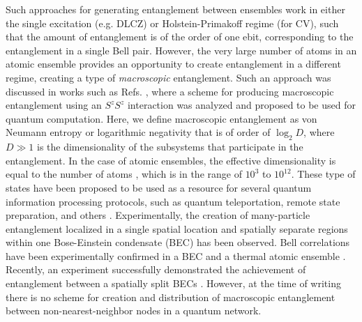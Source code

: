 \documentclass[%
  prx,%
  twocolumn,%
  preprintnumbers,%
  amsmath,%
  amssymb,%
  superscriptaddress%
]{revtex4}
\begin{document}
Such approaches for generating entanglement between ensembles work in either the single excitation  (e.g.  DLCZ) or Holstein-Primakoff regime (for CV), such that the amount of entanglement is of the order of one ebit, corresponding to the entanglement in a single Bell pair.  However, the very large number of atoms in an atomic ensemble provides an opportunity to create entanglement in a different regime, creating a type of {\it macroscopic} entanglement.  Such an approach was discussed in works such as Refs. \cite{byrnes2013fractality,pyrkov2013entanglement,rosseau2014,byrnes2012macroscopic,hussain2014geometric}, where a scheme for producing macroscopic entanglement using an $ S^z S^z$ interaction was analyzed and proposed to be used for quantum computation. Here, we define macroscopic entanglement as von Neumann entropy or logarithmic negativity that is of order of $ \log_2 D $, where $ D \gg 1  $ is the dimensionality of the subsystems that participate in the entanglement.  In the case of atomic ensembles, the effective dimensionality is equal to the number of atoms \cite{byrnes2020quantum}, which is in the range of $ 10^3 $ to $ 10^{12} $.   These type of states have been proposed to be used as a resource for several quantum information processing protocols, such as quantum teleportation, remote state preparation, and others \cite{pyrkov2014full,byrnes2015macroscopic,manish2021,byrnes2011accelerated}. Experimentally,
the creation of many-particle entanglement localized in a single spatial location \cite{schmied2016bell} and spatially separate regions \cite{fadel2018spatial} within one Bose-Einstein condensate (BEC) has been observed.
Bell correlations have been experimentally confirmed in a BEC \cite{schmied2016bell} and a thermal atomic ensemble \cite{engelsen2017}. Recently, an experiment successfully demonstrated the achievement of entanglement between a spatially split BECs \cite{Colciaghi2023}. However, at the time of writing there is no scheme for creation and distribution of macroscopic entanglement between non-nearest-neighbor nodes in a quantum network.
\end{document}
